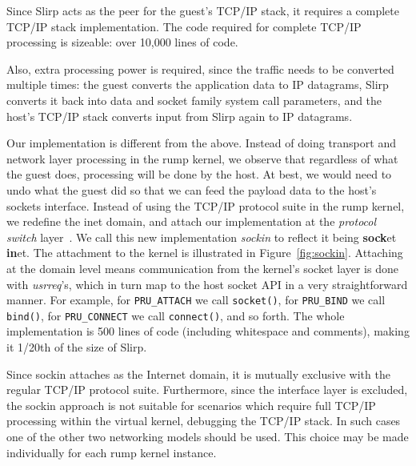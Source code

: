 Since Slirp acts as the peer for the guest's TCP/IP stack, it
requires a complete TCP/IP stack implementation.
The code required for complete TCP/IP processing is sizeable: over 10,000 lines of code.

Also, extra processing power is required, since the traffic needs
to be converted multiple times: the guest converts the application
data to IP datagrams, Slirp converts it back into data and socket
family system call parameters, and the host's TCP/IP stack converts
input from Slirp again to IP datagrams.

Our implementation is different from the above.  Instead of doing
transport and network layer processing in the rump kernel, we observe
that regardless of what the guest does, processing will be done by the
host.  At best, we would need to undo what the guest did so that we
can feed the payload data to the host's sockets interface.  Instead of
using the TCP/IP protocol suite in the rump kernel, we redefine the
inet domain, and attach our implementation at the \textit{protocol
switch} layer~\cite{stevens:tcpip2}.  We call this new implementation
\textit{sockin} to reflect it being \textbf{sock}et \textbf{in}et.
The attachment to the kernel is illustrated in
Figure~\ref{fig:sockin}.  Attaching at the domain level means
communication from the kernel's socket layer is done with
\textit{usrreq}'s, which in turn map to the host socket API in a very
straightforward manner.  For example, for \verb+PRU_ATTACH+ we call
\texttt{socket()}, for \verb+PRU_BIND+ we call \texttt{bind()}, for
\verb+PRU_CONNECT+ we call \texttt{connect()}, and so forth.  The
whole implementation is 500 lines of code (including whitespace and
comments), making it 1/20th of the size of Slirp.

Since sockin attaches as the Internet domain, it is mutually exclusive
with the regular TCP/IP protocol suite.  Furthermore, since the
interface layer is excluded, the sockin approach is not suitable for
scenarios which require full TCP/IP processing within the virtual
kernel, \eg debugging the TCP/IP stack.  In such cases one of the
other two networking models should be used.  This choice may
be made individually for each rump kernel instance.

